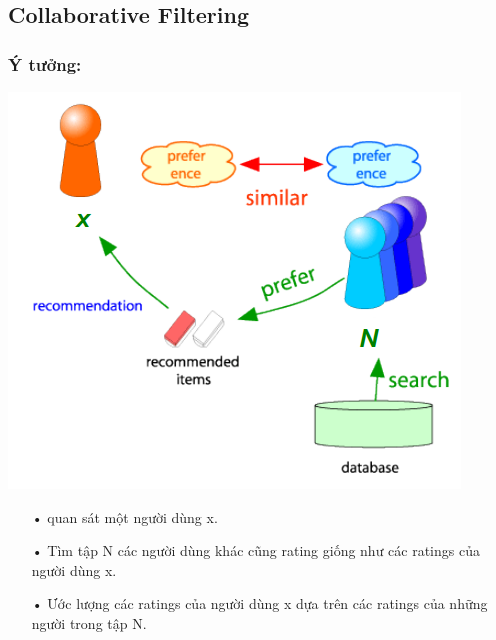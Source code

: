 \documentclass[a0,portrait,11pt]{a0poster}
\begin{document}
\begin{multicols}{2}
\begin{mybox}
\section*{Collaborative Filtering}
\subsubsection*{Ý tưởng:}
\begin{minipage}[c]{0.45\linewidth}
\includegraphics[width=0.8\linewidth]{CF.png}
\end{minipage}
\begin{minipage}[b]{0.45\linewidth}
\begin{itemize}
\item[•] quan sát một người dùng x.
\item[•] Tìm tập N các người dùng khác cũng rating giống như các ratings của
người dùng x.
\item[•] Ước lượng các ratings của người dùng x dựa trên các ratings của những
người trong tập N.
\end{itemize}
\end{minipage}

\end{mybox}
\end{multicols}
\end{document}
